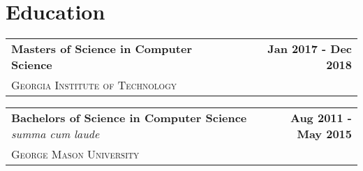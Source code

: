 \documentclass[letterpaper]{article}
\newenvironment{details}
{\begin{itemize}}
{\end{itemize}}
\begin{document}
  \setcounter{secnumdepth}{0}

  \section{Education}

  \noindent
  \begin{tabularx}{\textwidth}{@{}X r@{}}
    \textbf{Masters of Science in Computer Science} & \textbf{Jan 2017 - Dec 2018} \\
    \textsc{Georgia Institute of Technology} &
  \end{tabularx}

  \noindent
  \begin{tabularx}{\textwidth}{@{}X r@{}}
    \textbf{Bachelors of Science in Computer Science} \emph{summa cum laude} & \textbf{Aug 2011 - May 2015} \\
    \textsc{George Mason University} &
  \end{tabularx}

\end{document}

